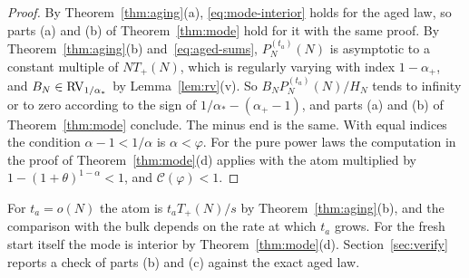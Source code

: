 \begin{proof}
By Theorem~\ref{thm:aging}(a), \eqref{eq:mode-interior} holds for the aged law, so parts (a)
and (b) of Theorem~\ref{thm:mode} hold for it with the same proof. By
Theorem~\ref{thm:aging}(b) and~\eqref{eq:aged-sums}, $P^{(t_a)}_N(N)$ is asymptotic to a
constant multiple of $NT_\plus(N)$, which is regularly varying with index $1-\alpha_\plus$, and
$B_N\in\mathrm{RV}_{1/\alpha_*}$ by Lemma~\ref{lem:rv}(v). So $B_NP^{(t_a)}_N(N)/H_N$ tends to infinity or
to zero according to the sign of $1/\alpha_*-(\alpha_\plus-1)$, and parts (a) and (b) of
Theorem~\ref{thm:mode} conclude. The minus end is the same. With equal indices the
condition $\alpha-1<1/\alpha$ is $\alpha<\varphi$. For the pure power laws the computation in
the proof of Theorem~\ref{thm:mode}(d) applies with the atom multiplied by
$1-(1+\theta)^{1-\alpha}<1$, and $\mathcal C(\varphi)<1$.
\end{proof}

For $t_a=o(N)$ the atom is $t_aT_\plus(N)/s$ by Theorem~\ref{thm:aging}(b), and the comparison
with the bulk depends on the rate at which $t_a$ grows. For the fresh start itself the mode
is interior by Theorem~\ref{thm:mode}(d). Section~\ref{sec:verify} reports a check of parts (b)
and (c) against the exact aged law.
